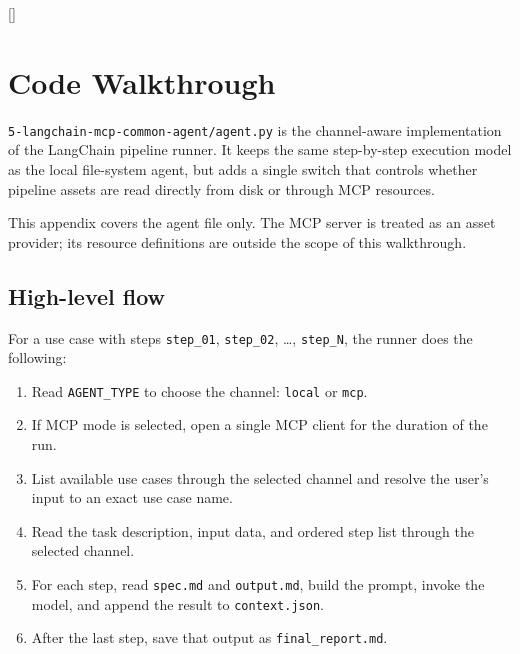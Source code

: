 \documentclass[12pt, a4paper]{article}
\begin{document}
\appendix
\renewcommand{\thesection}{\Alph{section}}
\titleformat{\section}{\Large\bfseries\color{darktext}}{Annex \thesection\ ---\ }{0em}{}[\color{primary}\titlerule]

\clearpage
\section{Code Walkthrough}

\texttt{5-langchain-mcp-common-agent/agent.py} is the channel-aware implementation of the LangChain pipeline runner. It keeps the same step-by-step execution model as the local file-system agent, but adds a single switch that controls whether pipeline assets are read directly from disk or through MCP resources.

This appendix covers the agent file only. The MCP server is treated as an asset provider; its resource definitions are outside the scope of this walkthrough.

\subsection{High-level flow}

For a use case with steps \texttt{step\_01}, \texttt{step\_02}, \ldots, \texttt{step\_N}, the runner does the following:

\begin{enumerate}[leftmargin=1.5em]
  \item Read \texttt{AGENT\_TYPE} to choose the channel: \texttt{local} or \texttt{mcp}.
  \item If MCP mode is selected, open a single MCP client for the duration of the run.
  \item List available use cases through the selected channel and resolve the user's input to an exact use case name.
  \item Read the task description, input data, and ordered step list through the selected channel.
  \item For each step, read \texttt{spec.md} and \texttt{output.md}, build the prompt, invoke the model, and append the result to \texttt{context.json}.
  \item After the last step, save that output as \texttt{final\_report.md}.
\end{enumerate}
\end{document}
